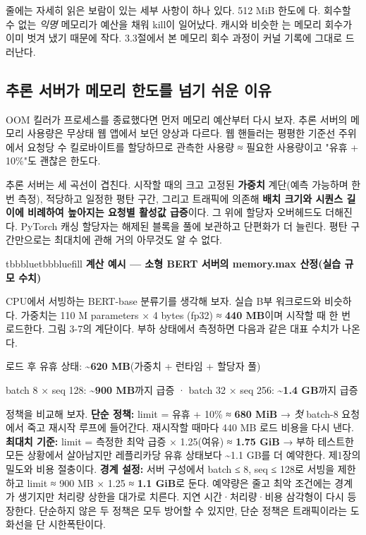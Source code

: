  줄에는 자세히 읽은 보람이 있는 세부 사항이 하나 있다. 512 MiB 한도에 다. 회수할 수 없는 \textit{익명} 메모리가 예산을 채워 kill이 일어났다. 캐시와 비슷한 는 메모리 회수가 이미 벗겨 냈기 때문에 작다. 3.3절에서 본 메모리 회수 과정이 커널 기록에 그대로 드러난다.

\subsection*{추론 서버가 메모리 한도를 넘기 쉬운 이유}

OOM 킬러가 프로세스를 종료했다면 먼저 메모리 예산부터 다시 보자. 추론 서버의 메모리 사용량은 무상태 웹 앱에서 보던 양상과 다르다. 웹 핸들러는 평평한 기준선 주위에서 요청당 수 킬로바이트를 할당하므로 관측한 사용량 ≈ 필요한 사용량이고 "유휴 + 10\%"도 괜찮은 한도다.

추론 서버는 세 곡선이 겹친다. 시작할 때의 크고 고정된 \textbf{가중치} 계단(예측 가능하며 한 번 측정), 적당하고 일정한 평탄 구간, 그리고 트래픽에 의존해 \textbf{배치 크기와 시퀀스 길이에 비례하여 높아지는 요청별 활성값 급증}이다. 그 위에 할당자 오버헤드도 더해진다. PyTorch 캐싱 할당자는 해제된 블록을 풀에 보관하고 단편화가 더 늘린다. 평탄 구간만으로는 최대치에 관해 거의 아무것도 알 수 없다.

\begin{calloutbox}{tbbblue}{tbbbluefill}
{\normalsize\bfseries\color{tbbblue}계산 예시 — 소형 BERT 서버의 memory.max 산정(실습 규모 수치)}\par\vspace{3pt}
CPU에서 서빙하는 BERT-base 분류기를 생각해 보자. 실습 B부 워크로드와 비슷하다. 가중치는 110 M parameters × 4 bytes (fp32) ≈ \textbf{440 MB}이며 시작할 때 한 번 로드한다. 그림 3-7의 계단이다. 부하 상태에서 측정하면 다음과 같은 대표 수치가 나온다.

\begin{tbbitemize}
  \item 로드 후 유휴 상태: \textbf{\textasciitilde{}620 MB}(가중치 + 런타임 + 할당자 풀)
  \item batch 8 × seq 128: \textbf{\textasciitilde{}900 MB}까지 급증  ·  batch 32 × seq 256: \textbf{\textasciitilde{}1.4 GB}까지 급증
\end{tbbitemize}

정책을 비교해 보자. \textbf{단순 정책:} limit = 유휴 + 10\% ≈ \textbf{680 MiB} → \textit{첫} batch-8 요청에서 죽고 재시작 루프에 들어간다. 재시작할 때마다 440 MB 로드 비용을 다시 낸다. \textbf{최대치 기준:} limit = 측정한 최악 급증 × 1.25(여유) ≈ \textbf{1.75 GiB} → 부하 테스트한 모든 상황에서 살아남지만 레플리카당 유휴 상태보다 \textasciitilde{}1.1 GB를 더 예약한다. 제1장의 밀도와 비용 절충이다. \textbf{경계 설정:} 서버 구성에서 batch ≤ 8, seq ≤ 128로 서빙을 제한하고 limit ≈ 900 MB × 1.25 ≈ \textbf{1.1 GiB}로 둔다. 예약량은 줄고 최악 조건에는 경계가 생기지만 처리량 상한을 대가로 치른다. 지연 시간·처리량·비용 삼각형이 다시 등장한다. 단순하지 않은 두 정책은 모두 방어할 수 있지만, 단순 정책은 트래픽이라는 도화선을 단 시한폭탄이다.
\end{calloutbox}

